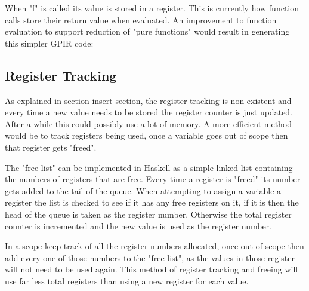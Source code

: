 

When "f" is called its value is stored in a register. This is currently how function calls
store their return value when evaluated. An improvement to function evaluation to support
reduction of "pure functions" would result in generating this simpler GPIR code:




\subsection{Register Tracking}
As explained in section {insert section}, the register tracking is non existent and every
time a new value needs to be stored the register counter is just updated. After a while this
could possibly use a lot of memory. A more efficient method would be to track registers
being used, once a variable goes out of scope then that register gets "freed".

The "free list" can be implemented in Haskell as a simple linked list containing the numbers
of registers that are free. Every time a register is "freed" its number gets added
to the tail of the queue. When attempting to assign a variable a register the list is checked
to see if it has any free registers on it, if it is then the head of the queue is taken
as the register number. Otherwise the total register counter is incremented and the new value
is used as the register number.

In a scope keep track of all the register numbers allocated, once out of scope then add every
one of those numbers to the "free list", as the values in those register will not need
to be used again. This method of register tracking and freeing will use far less total
registers than using a new register for each value.

